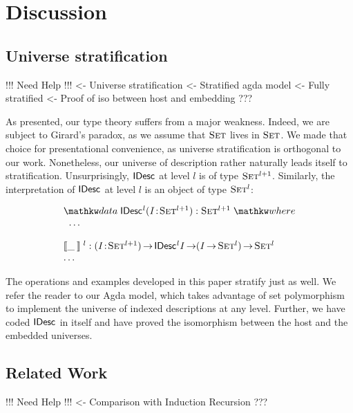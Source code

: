 \section{Discussion}
\label{sec:discussion}

\subsection{Universe stratification}

\begin{wstructure}
!!! Need Help !!!
<- Universe stratification
    <- Stratified agda model
        <- Fully stratified
        <- Proof of iso between host and embedding
    ???
\end{wstructure}

As presented, our type theory suffers from a major weakness. Indeed,
we are subject to Girard's paradox, as we assume that $\Set$ lives in
$\Set$. We made that choice for presentational convenience, as
universe stratification is orthogonal to our work. Nonetheless, our
universe of description rather naturally leads itself to
stratification. Unsurprisingly, $\IDesc{\!}$ at level $l$ is of type
$\Set^{\blue{l+1}}$. Similarly, the interpretation of $\IDesc{\!}$ at
level $l$ is an object of type $\Set^{\blue{l}}$:

\[\stk{
\data \IDesc{\!}^{\blue{l}} (\Bhab{\V{I}}{\Set^{\blue{l+1}}}) : \Set^{\blue{l+1}} \where \\
\;\;\ldots \\
\\
\idescop{\_\:}{}{}^{\blue{l}} : \PI{\V{I}}{\Set^{\blue{l+1}}} \IDesc{{\!}^{\blue{l}}\V{I}} \To (\V{I} \To \Set^{\blue{l}}) \To \Set^{\blue{l}}    \\
\ldots
}\]

The operations and examples developed in this paper stratify just as
well. We refer the reader to our Agda model, which takes advantage of
set polymorphism to implement the universe of indexed descriptions at
any level. Further, we have coded $\IDesc{\!}$ in itself and have
proved the isomorphism between the host and the embedded universes.

\subsection{Related Work}

\begin{structure}
!!! Need Help !!!
<- Comparison with Induction Recursion
    ???
\end{structure}


